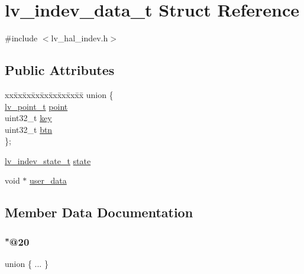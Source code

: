 \hypertarget{structlv__indev__data__t}{}\section{lv\+\_\+indev\+\_\+data\+\_\+t Struct Reference}
\label{structlv__indev__data__t}


{\ttfamily \#include $<$lv\+\_\+hal\+\_\+indev.\+h$>$}

\subsection*{Public Attributes}
\begin{DoxyCompactItemize}
\item 
\begin{tabbing}
xx\=xx\=xx\=xx\=xx\=xx\=xx\=xx\=xx\=\kill
union \{\\
\>\mbox{\hyperlink{structlv__point__t}{lv\_point\_t}} \mbox{\hyperlink{structlv__indev__data__t_afaecb3fba20bd3d6f798dea8b207f257}{point}}\\
\>uint32\_t \mbox{\hyperlink{structlv__indev__data__t_a5f93f90c6ffe0f7db54a0fc43a1cef9c}{key}}\\
\>uint32\_t \mbox{\hyperlink{structlv__indev__data__t_a70a6c99a31cf3f7d72f930f509e437c5}{btn}}\\
\}; \\

\end{tabbing}\item 
\mbox{\hyperlink{lv__hal__indev_8h_aacdf3efce400e71895f5efb42ee24956}{lv\+\_\+indev\+\_\+state\+\_\+t}} \mbox{\hyperlink{structlv__indev__data__t_aed0de26ed88301e92bc3d95020a9893b}{state}}
\item 
void $\ast$ \mbox{\hyperlink{structlv__indev__data__t_a3d3c3ebaad740f87522f8733801811bf}{user\+\_\+data}}
\end{DoxyCompactItemize}


\subsection{Member Data Documentation}
\mbox{\label{structlv__indev__data__t_a0bcd3a10a86eab142dc1b1d9f0eae0b3}} 
\subsubsection{\texorpdfstring{"@20}{@20}}
{\footnotesize\ttfamily union \{ ... \} }

